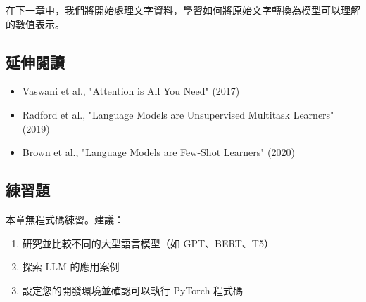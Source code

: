 在下一章中，我們將開始處理文字資料，學習如何將原始文字轉換為模型可以理解的數值表示。

\subsection{延伸閱讀}

\begin{itemize}
    \item Vaswani et al., "Attention is All You Need" (2017)
    \item Radford et al., "Language Models are Unsupervised Multitask Learners" (2019)
    \item Brown et al., "Language Models are Few-Shot Learners" (2020)
\end{itemize}

\subsection{練習題}

本章無程式碼練習。建議：

\begin{enumerate}
    \item 研究並比較不同的大型語言模型（如 GPT、BERT、T5）
    \item 探索 LLM 的應用案例
    \item 設定您的開發環境並確認可以執行 PyTorch 程式碼
\end{enumerate}
